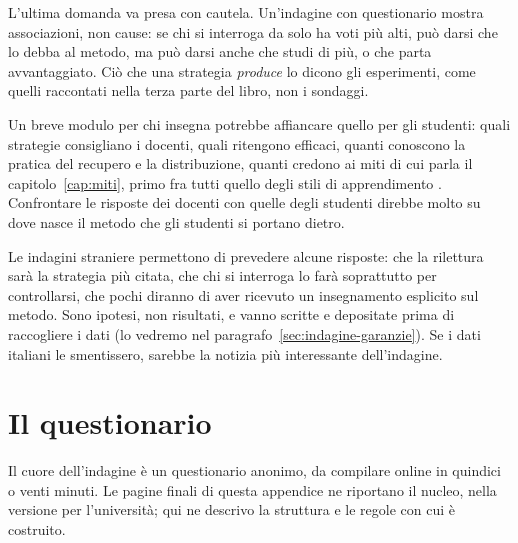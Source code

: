 L'ultima domanda va presa con cautela. Un'indagine con questionario
mostra associazioni, non cause: se chi si interroga da solo ha voti più
alti, può darsi che lo debba al metodo, ma può darsi anche che studi di
più, o che parta avvantaggiato. Ciò che una strategia \emph{produce}
lo dicono gli esperimenti, come quelli raccontati nella terza parte del
libro, non i sondaggi.

Un breve modulo per chi insegna potrebbe affiancare quello per gli
studenti: quali strategie consigliano i docenti, quali ritengono
efficaci, quanti conoscono la pratica del recupero e la distribuzione,
quanti credono ai miti di cui parla il capitolo~\ref{cap:miti}, primo
fra tutti quello degli stili di apprendimento
\parencite{dekker2012,bei2023}. Confrontare le risposte dei docenti con
quelle degli studenti direbbe molto su dove nasce il metodo che gli
studenti si portano dietro.

Le indagini straniere permettono di prevedere alcune risposte: che la
rilettura sarà la strategia più citata, che chi si interroga lo farà
soprattutto per controllarsi, che pochi diranno di aver ricevuto un
insegnamento esplicito sul metodo. Sono ipotesi, non risultati, e vanno
scritte e depositate prima di raccogliere i dati (lo vedremo nel
paragrafo~\ref{sec:indagine-garanzie}). Se i dati italiani le
smentissero, sarebbe la notizia più interessante dell'indagine.

\section{Il questionario}
\label{sec:indagine-questionario}

Il cuore dell'indagine è un questionario anonimo, da compilare online in
quindici o venti minuti. Le pagine finali di questa appendice ne
riportano il nucleo, nella versione per l'università; qui ne descrivo
la struttura e le regole con cui è costruito.


